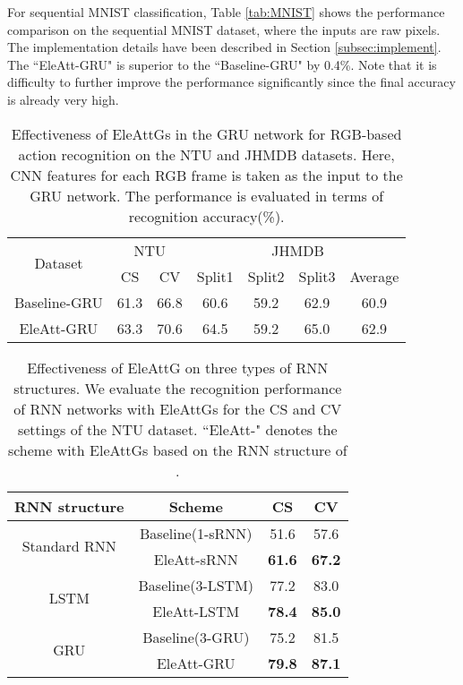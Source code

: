 \documentclass[journal]{IEEEtran}
\newcommand{\EleAttGn}{{EleAttG}}
\begin{document}
For sequential MNIST classification, Table \ref{tab:MNIST} shows the performance comparison on the sequential MNIST dataset, where the inputs are raw pixels. The implementation details have been described in Section \ref{subsec:implement}. The ``EleAtt-GRU" is superior to the ``Baseline-GRU" by 0.4\%. Note that it is difficulty to further improve the performance significantly since the final accuracy is already very high.

\setlength{\tabcolsep}{7pt}
\begin{table}[t]
	\centering
	\caption{Effectiveness of {\EleAttGn}s in the GRU network for RGB-based action recognition on the NTU and JHMDB datasets. Here, CNN features for each RGB frame is taken as the input to the GRU network. The performance is evaluated in terms of recognition accuracy(\%).}
	\label{tab:rgb}
	\begin{tabular}{ccccccc}
		\toprule
		\multirow{2}{*}{Dataset} & \multicolumn{2}{c}{NTU} & \multicolumn{4}{c}{JHMDB}        \\
		\cmidrule(lr){2-3}
		\cmidrule(lr){4-7}
		& CS         & CV         & Split1 & Split2 & Split3 & Average  \\
		\midrule
		Baseline-GRU                & 61.3      & 66.8      & 60.6  & 59.2  & 62.9  & 60.9 \\
		EleAtt-GRU                    & 63.3      & 70.6      & 64.5  & 59.2  & 65.0  & 62.9 \\
		\bottomrule
	\end{tabular}
\end{table}

\setlength{\tabcolsep}{7pt}
\begin{table}[t]
	\centering
	\caption{Effectiveness of {\EleAttGn} on three types of RNN structures. We evaluate the recognition performance of RNN networks with {\EleAttGn}s for the CS and CV settings of the NTU dataset. ``EleAtt-" denotes the scheme with {\EleAttGn}s based on the RNN structure of .}
	\label{tab:Extend}
	\begin{tabular}{cccc}
		\toprule
		RNN structure                    & Scheme     & CS & CV \\
		\midrule
		\multirow{2}{*}{Standard RNN} & Baseline(1-sRNN)   & 51.6    & 57.6 \\
		& EleAtt-sRNN & \textbf{61.6}     & \textbf{67.2}  \\
		\midrule
		\multirow{2}{*}{LSTM}      & Baseline(3-LSTM)   & 77.2     & 83.0  \\
		& EleAtt-LSTM     & \textbf{78.4}     & \textbf{85.0}  \\
		\midrule
		\multirow{2}{*}{GRU}       & Baseline(3-GRU)   & 75.2     & 81.5  \\
		& EleAtt-GRU       & \textbf{79.8}     & \textbf{87.1} 							\\
		\bottomrule	
	\end{tabular}
\end{table}
\end{document}
